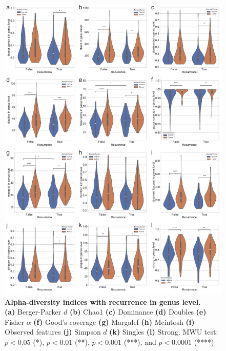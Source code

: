 \documentclass[11pt, a4paper, onecolumn, oneside]{report}
\begin{document}
            \begin{figure}[p]
                \centering
                \includegraphics[width=\linewidth]{Figures/CRC/Figure_03.pdf}
                \caption[Alpha-diversity indices with recurrence in genus level]{\textbf{Alpha-diversity indices with recurrence in genus level.}\\
                    \textbf{(a)} Berger-Parker $d$ \textbf{(b)} Chao1 \textbf{(c)} Dominance \textbf{(d)} Doubles \textbf{(e)} Fisher $\alpha$ \textbf{(f)} Good's coverage \textbf{(g)} Margalef \textbf{(h)} Mcintosh \textbf{(i)} Observed features \textbf{(j)} Simpson $d$ \textbf{(k)} Singles \textbf{(l)} Strong. MWU test: $p < 0.05$ (*), $p < 0.01$ (**), $p < 0.001$ (***), and $p < 0.0001$ (****)}
                \label{fig:CRC-alpha-recurrence}
            \end{figure}
            \clearpage
\end{document}
